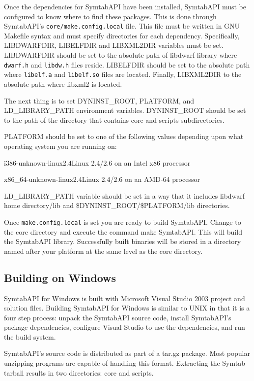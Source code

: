 Once the dependencies for SymtabAPI have been installed, SymtabAPI must be
configured to know where to find these packages. This is done through
SymtabAPI's \texttt{core/make.config.local} file. This file must be written in
GNU Makefile syntax and must specify directories for each dependency.
Specifically, LIBDWARFDIR, LIBELFDIR and LIBXML2DIR variables must be set.
LIBDWARFDIR should be set to the absolute path of libdwarf library where
\texttt{dwarf.h} and \texttt{libdw.h} files reside. LIBELFDIR should be set
to the absolute path where \texttt{libelf.a} and \texttt{libelf.so} files are
located. Finally, LIBXML2DIR to the absolute path where libxml2 is located.

The next thing is to set DYNINST\_ROOT, PLATFORM, and LD\_LIBRARY\_PATH
environment variables. DYNINST\_ROOT should be set to the path of the directory
that contains core and scripts subdirectories.

PLATFORM should be set to one of the following values depending upon what operating system you are running on:
\begin{description}
    \item i386-unknown-linux2.4Linux 2.4/2.6 on an Intel x86 processor
    \item x86\_64-unknown-linux2.4Linux 2.4/2.6 on an AMD-64 processor
\end{description}

LD\_LIBRARY\_PATH variable should be set in a way that it includes libdwarf home
directory/lib and \${DYNINST\_ROOT}/\${PLATFORM}/lib directories.

Once \texttt{make.config.local} is set you are ready to build SymtabAPI. Change
to the core directory and execute the command make SymtabAPI. This will build
the SymtabAPI library. Successfully built binaries will be stored in a directory
named after your platform at the same level as the core directory.

\subsection{Building on Windows}

SymtabAPI for Windows is built with Microsoft Visual Studio 2003 project and
solution files.   Building SymtabAPI for Windows is similar to UNIX in that it
is a four step process: unpack the SymtabAPI source code, install SymtabAPI's
package dependencies, configure Visual Studio to use the dependencies, and run
the build system.

SymtabAPI's source code is distributed as part of a tar.gz package. Most popular
unzipping programs are capable of handling this format. Extracting the Symtab
tarball results in two directories: core and scripts.

